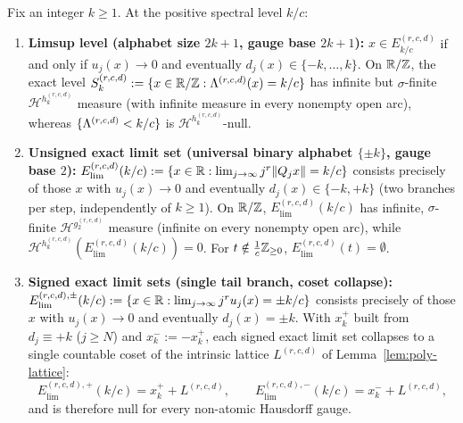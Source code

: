 \begin{theorem}\label{thm:poly-gauge-trichotomy}
Fix an integer $k\ge1$. At the positive spectral level $k/c$:
\begin{enumerate}[label=(\roman*),leftmargin=2em]
\item \textbf{Limsup level (alphabet size $2k+1$, gauge base $2k+1$):}
$x\in E_{k/c}^{(r,c,d)}$ if and only if $u_j(x)\to0$ and eventually
$d_j(x)\in\{-k,\dots,k\}$. On $\mathbb{R}/\mathbb{Z}$, the exact level
$S_k^{(r,c,d)}:=\{x\in\mathbb{R}/\mathbb{Z}:\Lambda^{(r,c,d)}(x)=k/c\}$ has infinite but
$\sigma$-finite $\mathcal H^{h_k^{(r,c,d)}}$ measure (with infinite measure in
every nonempty open arc), whereas $\{\Lambda^{(r,c,d)}<k/c\}$ is
$\mathcal H^{h_k^{(r,c,d)}}$-null.
\item \textbf{Unsigned exact limit set (universal binary alphabet $\{\pm k\}$, gauge base $2$):}
$E_{\mathrm{lim}}^{(r,c,d)}(k/c):=\{x\in\mathbb{R}:\lim_{j\to\infty}j^r\|Q_jx\|=k/c\}$
consists precisely of those $x$ with $u_j(x)\to0$ and eventually
$d_j(x)\in\{-k,+k\}$ (two branches per step, independently of $k\ge1$). On
$\mathbb{R}/\mathbb{Z}$, $E_{\mathrm{lim}}^{(r,c,d)}(k/c)$ has infinite, $\sigma$-finite
$\mathcal H^{g_2^{(r,c,d)}}$ measure (infinite on every nonempty open arc),
while $\mathcal H^{h_k^{(r,c,d)}}(E_{\mathrm{lim}}^{(r,c,d)}(k/c))=0$. For
$t\notin\frac1c\mathbb{Z}_{\ge0}$, $E_{\mathrm{lim}}^{(r,c,d)}(t)=\emptyset$.
\item \textbf{Signed exact limit sets (single tail branch, coset collapse):}
$E_{\mathrm{lim}}^{(r,c,d),\pm}(k/c):=\{x\in\mathbb{R}:\lim_{j\to\infty}j^ru_j(x)=\pm k/c\}$
consists precisely of those $x$ with $u_j(x)\to0$ and eventually $d_j(x)=\pm k$.
With $x_k^+$ built from $d_j\equiv+k$ ($j\ge N$) and $x_k^-:=-x_k^+$, each signed
exact limit set collapses to a single countable coset of the intrinsic lattice
$L^{(r,c,d)}$ of Lemma~\ref{lem:poly-lattice}:
\[
E_{\mathrm{lim}}^{(r,c,d),+}(k/c)=x_k^+ + L^{(r,c,d)},\qquad
E_{\mathrm{lim}}^{(r,c,d),-}(k/c)=x_k^- + L^{(r,c,d)},
\]
and is therefore null for every non-atomic Hausdorff gauge.
\end{enumerate}
\end{theorem}

